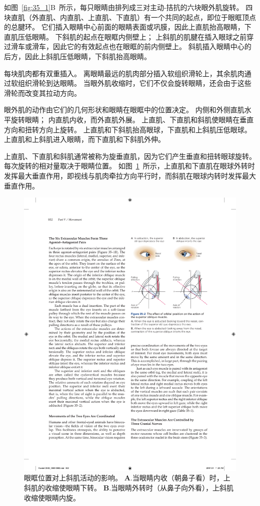 如图~\ref{fig:35_1}B~所示，每只眼睛由排列成三对主动-拮抗的六块眼外肌旋转。
四块直肌（外直肌、内直肌、上直肌、下直肌）有一个共同的起点，即位于眼眶顶点的总腱环。
它们插入眼睛中心前面的眼睛表面或巩膜，因此上直肌抬高眼睛，下直肌压低眼睛。
下斜肌的起点在眼眶内侧壁上；
上斜肌的肌腱在插入眼球之前穿过滑车或滑车，因此它的有效起点也在眼眶的前内侧壁上。
斜肌插入眼睛中心的后方，因此上斜肌压低眼睛，下斜肌抬高眼睛。


每块肌肉都有双重插入。
离眼睛最远的肌肉部分插入软组织滑轮上，其余肌肉通过软组织滑轮到达眼睛。
当眼外肌收缩时，它们不仅会旋转眼睛，还会由于这些滑轮而改变其拉动方向。


眼外肌的动作由它们的几何形状和眼睛在眼眶中的位置决定。
内侧和外侧直肌水平旋转眼睛；
内直肌内收，而外直肌外展。
上直肌、下直肌和斜肌使眼睛在垂直方向和扭转方向上旋转。
上直肌和下斜肌抬高眼球，下直肌和上斜肌压低眼球。
上直肌和上斜肌进入眼睛，而下直肌和下斜肌外伸。


上直肌、下直肌和斜肌通常被称为旋垂直肌，因为它们产生垂直和扭转眼球旋转。
每次旋转的相对量取决于眼睛位置。
如图~\ref{fig:35_2}~所示，上直肌和下直肌在眼球外转时发挥最大垂直作用，即视线与肌肉牵拉方向平行时，而斜肌在眼球内转时发挥最大垂直作用。


\begin{figure}[htbp]
	\centering
	\includegraphics[width=0.65\linewidth]{chap35/fig_35_2}
	\caption{眼眶位置对上斜肌活动的影响。
		\textbf{A}.当眼睛内收（朝鼻子看）时，上斜肌的收缩使眼睛下转。
		\textbf{B}.当眼睛外转时（从鼻子向外看），上斜肌收缩使眼睛内旋。}
	\label{fig:35_2}
\end{figure}



